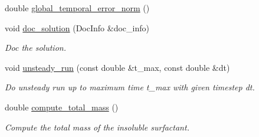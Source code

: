 \begin{DoxyCompactItemize}
\item 
double \hyperlink{classInterfaceProblem_a5eb5fa3bf4e7884984f285e24ba3ee7b}{global\+\_\+temporal\+\_\+error\+\_\+norm} ()
\item 
void \hyperlink{classInterfaceProblem_a49714e35e94f7d2af0b6ddd22b851f52}{doc\+\_\+solution} (Doc\+Info \&doc\+\_\+info)
\begin{DoxyCompactList}\small\item\em Doc the solution. \end{DoxyCompactList}\item 
void \hyperlink{classInterfaceProblem_adf1f4e43d10939e4323e0e315b711085}{unsteady\+\_\+run} (const double \&t\+\_\+max, const double \&dt)
\begin{DoxyCompactList}\small\item\em Do unsteady run up to maximum time t\+\_\+max with given timestep dt. \end{DoxyCompactList}\item 
double \hyperlink{classInterfaceProblem_a9b19bc90667fe8c7885d8ee113812e27}{compute\+\_\+total\+\_\+mass} ()
\begin{DoxyCompactList}\small\item\em Compute the total mass of the insoluble surfactant. \end{DoxyCompactList}\end{DoxyCompactItemize}
